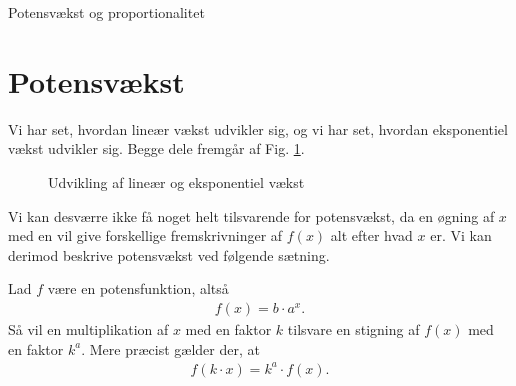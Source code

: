 
\begin{center}
\Huge
Potensvækst og proportionalitet
\end{center}

\section*{Potensvækst}
Vi har set, hvordan lineær vækst udvikler sig, og vi har set, hvordan eksponentiel vækst udvikler sig. Begge dele fremgår af Fig. \ref{fig:lineks}.
\begin{figure}[H]
\centering
{}
\caption{Udvikling af lineær og eksponentiel vækst}
\label{fig:lineks}
\end{figure}
Vi kan desværre ikke få noget helt tilsvarende for potensvækst, da en øgning af $x$ med en vil give forskellige fremskrivninger af $f(x)$ alt efter hvad $x$ er. Vi kan derimod beskrive potensvækst ved følgende sætning.
\begin{setn}
Lad $f$ være en potensfunktion, altså 
\begin{align*}
f(x) = b\cdot a^x.
\end{align*}
Så vil en multiplikation af $x$ med en faktor $k$ tilsvare en stigning af $f(x)$ med en faktor $k^a$. Mere præcist gælder der, at 
\begin{align*}
f(k\cdot x) = k^a\cdot f(x).
\end{align*}
\end{setn}
